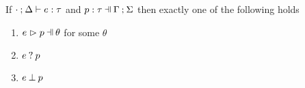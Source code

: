 \begin{lem}
  \label{lemma:match-determinism}
  If $\cdot \mathbin{;} \Delta \vdash e : \tau$ and $\hpattyp{p}{\tau}{\Gamma}{\Sigma}$ then exactly one of the following holds
  \begin{enumerate}
    \item $\hpatmatch{e}{p}{\theta}$ for some $\theta$
    \item $e \mathbin{?} p$
    \item $e \mathbin{\bot} p$
  \end{enumerate}
\end{lem}
